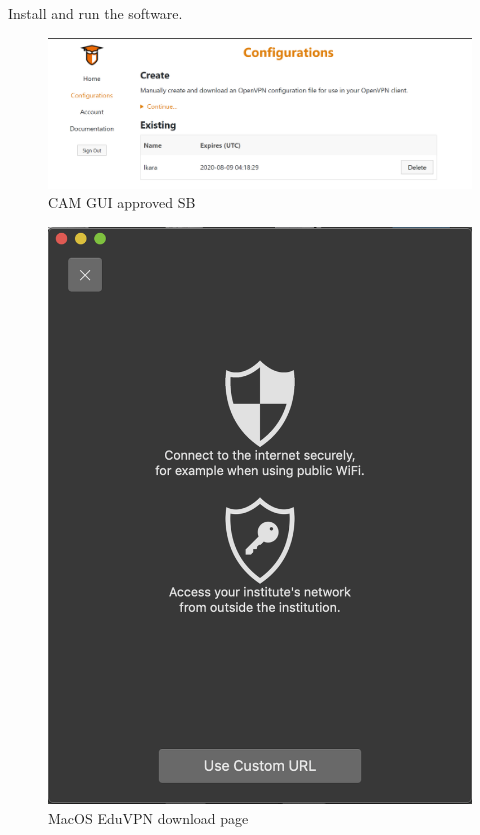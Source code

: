 Install and run the software.



\begin{figure}[!thb]
	\centering
	\includegraphics[scale=0.23]{Chapters/images/image45.png}
	
	\caption{CAM GUI approved SB }
	\label{fig:image45}
\end{figure}

\begin{figure}[!thb]
	\centering
	\includegraphics[scale=0.23]{Chapters/images/image105.png}
	
	\caption{MacOS EduVPN download page }
	\label{fig:image105}
\end{figure}

